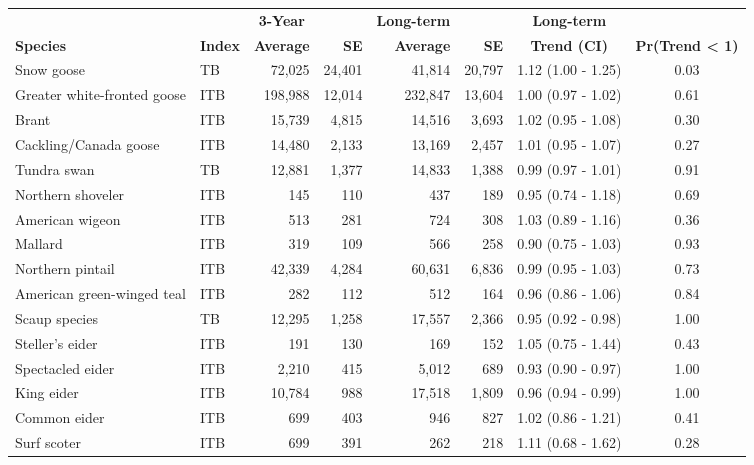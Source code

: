 \documentclass[
]{article}
\begin{document}
\begin{longtable}[t]{llrrrrcc}
\\
\toprule
\multicolumn{1}{c}{\textbf{ }} & \multicolumn{1}{c}{\textbf{ }} & \multicolumn{1}{c}{\textbf{3-Year}} & \multicolumn{1}{c}{\textbf{ }} & \multicolumn{1}{c}{\textbf{Long-term}} & \multicolumn{1}{c}{\textbf{ }} & \multicolumn{1}{c}{\textbf{Long-term}} & \multicolumn{1}{c}{\textbf{ }} \\
\cmidrule(l{3pt}r{3pt}){3-3} \cmidrule(l{3pt}r{3pt}){5-5} \cmidrule(l{3pt}r{3pt}){7-7}
\textbf{Species} & \textbf{Index} & \textbf{Average} & \textbf{SE} & \textbf{Average} & \textbf{SE} & \textbf{Trend (CI)} & \textbf{Pr(Trend < 1)}\\
\midrule
Snow goose & TB & 72,025 & 24,401 & 41,814 & 20,797 & 1.12 (1.00 - 1.25) & 0.03\\
Greater white-fronted goose & ITB & 198,988 & 12,014 & 232,847 & 13,604 & 1.00 (0.97 - 1.02) & 0.61\\
Brant & ITB & 15,739 & 4,815 & 14,516 & 3,693 & 1.02 (0.95 - 1.08) & 0.30\\
Cackling/Canada goose & ITB & 14,480 & 2,133 & 13,169 & 2,457 & 1.01 (0.95 - 1.07) & 0.27\\
Tundra swan & TB & 12,881 & 1,377 & 14,833 & 1,388 & 0.99 (0.97 - 1.01) & 0.91\\
\addlinespace
Northern shoveler & ITB & 145 & 110 & 437 & 189 & 0.95 (0.74 - 1.18) & 0.69\\
American wigeon & ITB & 513 & 281 & 724 & 308 & 1.03 (0.89 - 1.16) & 0.36\\
Mallard & ITB & 319 & 109 & 566 & 258 & 0.90 (0.75 - 1.03) & 0.93\\
Northern pintail & ITB & 42,339 & 4,284 & 60,631 & 6,836 & 0.99 (0.95 - 1.03) & 0.73\\
American green-winged teal & ITB & 282 & 112 & 512 & 164 & 0.96 (0.86 - 1.06) & 0.84\\
\addlinespace
Scaup species & TB & 12,295 & 1,258 & 17,557 & 2,366 & 0.95 (0.92 - 0.98) & 1.00\\
Steller's eider & ITB & 191 & 130 & 169 & 152 & 1.05 (0.75 - 1.44) & 0.43\\
Spectacled eider & ITB & 2,210 & 415 & 5,012 & 689 & 0.93 (0.90 - 0.97) & 1.00\\
King eider & ITB & 10,784 & 988 & 17,518 & 1,809 & 0.96 (0.94 - 0.99) & 1.00\\
Common eider & ITB & 699 & 403 & 946 & 827 & 1.02 (0.86 - 1.21) & 0.41\\
\addlinespace
Surf scoter & ITB & 699 & 391 & 262 & 218 & 1.11 (0.68 - 1.62) & 0.28\\

\end{longtable}
\end{document}
